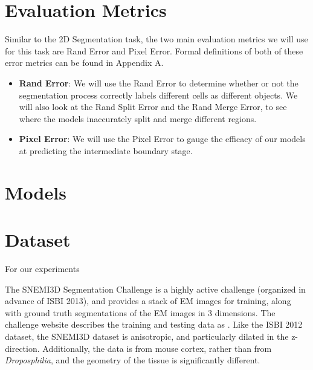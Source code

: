 \section{Evaluation Metrics}

Similar to the 2D Segmentation task, the two main evaluation metrics we will use for this task are Rand Error and Pixel Error. Formal definitions of both of these error metrics can be found in Appendix A. 

\begin{itemize}
\item \textbf{Rand Error}: We will use the Rand Error to determine whether or not the segmentation process correctly labels different cells as different objects. We will also look at the Rand Split Error and the Rand Merge Error, to see where the models inaccurately split and merge different regions.
\item \textbf{Pixel Error}: We will use the Pixel Error to gauge the efficacy of our models at predicting the intermediate boundary stage.
\end{itemize}

\section{Models}

\section{Dataset}

For our experiments

The SNEMI3D Segmentation Challenge is a highly active challenge (organized in advance of ISBI 2013), and provides a stack of EM images for training, along with ground truth segmentations of the EM images in 3 dimensions. The challenge website describes the training and testing data as \cite{Arganda-Carreras2013}. Like the ISBI 2012 dataset, the SNEMI3D dataset is anisotropic, and particularly dilated in the z-direction. Additionally, the data is from mouse cortex, rather than from \textit{Droposphilia}, and the geometry of the tissue is significantly different. 

